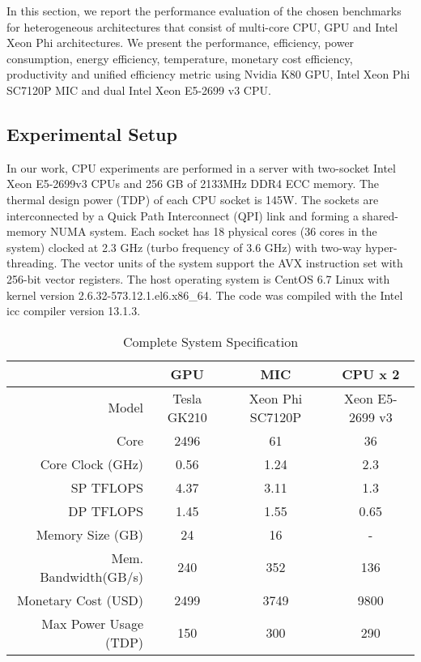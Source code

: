 
In this section, we report the performance evaluation of the chosen benchmarks for heterogeneous architectures that consist of multi-core CPU, GPU and Intel Xeon Phi architectures. We present the performance, efficiency, power consumption, energy efficiency, temperature, monetary cost efficiency, productivity and unified efficiency metric using Nvidia K80 GPU, Intel Xeon Phi SC7120P MIC and dual Intel Xeon E5-2699 v3 CPU. 


\subsection{Experimental Setup}
In our work, CPU experiments are performed in a server with  two-socket Intel 
Xeon E5-2699v3 CPUs and 256 GB of 2133MHz DDR4 ECC memory. 
The thermal design power (TDP) of each CPU socket is 145W. 
The sockets are interconnected by a Quick Path Interconnect (QPI) link and forming a shared-memory NUMA system. 
Each socket has 18 physical cores (36 cores in the system) clocked at 2.3 GHz (turbo frequency of 3.6 GHz) with two-way hyper-threading. The vector units of the system support the AVX instruction set with 256-bit vector registers. The host operating system is CentOS 6.7 Linux with kernel version 2.6.32-573.12.1.el6.x86\_64. The code was compiled with the Intel icc compiler version 13.1.3.


\begin{table}[htbp]
  \centering
      \caption{Complete System Specification}
    \begin{adjustbox}{width=0.5\textwidth}
    \begin{tabular}{rccc}
    \toprule
          & GPU   & MIC   & CPU x 2 \\
    \midrule
    Model & Tesla GK210 & Xeon Phi SC7120P & Xeon E5-2699 v3 \\
    Core  & 2496  & 61    & 36 \\
    Core Clock (GHz) & 0.56  & 1.24  & 2.3 \\
    SP TFLOPS & 4.37  & 3.11  & 1.3 \\
    DP TFLOPS & 1.45  & 1.55  & 0.65 \\
    Memory Size (GB) & 24    & 16    & - \\
    Mem. Bandwidth(GB/s) & 240   & 352   & 136 \\
    Monetary Cost (USD) & 2499  & 3749  & 9800 \\
    Max Power Usage (TDP) & 150   & 300   & 290 \\
    \bottomrule
    \end{tabular}%
    \label{tab:specification}
    \end{adjustbox}

\end{table}%

